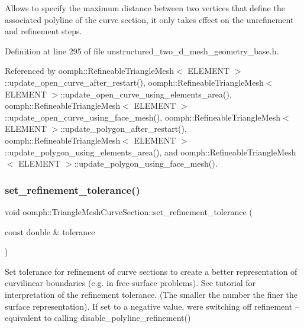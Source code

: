 Allows to specify the maximum distance between two vertices that define the associated polyline of the curve section, it only takes effect on the unrefinement and refinement steps. 



Definition at line 295 of file unstructured\+\_\+two\+\_\+d\+\_\+mesh\+\_\+geometry\+\_\+base.\+h.



Referenced by oomph\+::\+Refineable\+Triangle\+Mesh$<$ E\+L\+E\+M\+E\+N\+T $>$\+::update\+\_\+open\+\_\+curve\+\_\+after\+\_\+restart(), oomph\+::\+Refineable\+Triangle\+Mesh$<$ E\+L\+E\+M\+E\+N\+T $>$\+::update\+\_\+open\+\_\+curve\+\_\+using\+\_\+elements\+\_\+area(), oomph\+::\+Refineable\+Triangle\+Mesh$<$ E\+L\+E\+M\+E\+N\+T $>$\+::update\+\_\+open\+\_\+curve\+\_\+using\+\_\+face\+\_\+mesh(), oomph\+::\+Refineable\+Triangle\+Mesh$<$ E\+L\+E\+M\+E\+N\+T $>$\+::update\+\_\+polygon\+\_\+after\+\_\+restart(), oomph\+::\+Refineable\+Triangle\+Mesh$<$ E\+L\+E\+M\+E\+N\+T $>$\+::update\+\_\+polygon\+\_\+using\+\_\+elements\+\_\+area(), and oomph\+::\+Refineable\+Triangle\+Mesh$<$ E\+L\+E\+M\+E\+N\+T $>$\+::update\+\_\+polygon\+\_\+using\+\_\+face\+\_\+mesh().

\mbox{\label{classoomph_1_1TriangleMeshCurveSection_a3ebe8f25753aefe11af4aa8081644462}} 
\subsubsection{\texorpdfstring{set\+\_\+refinement\+\_\+tolerance()}{set\_refinement\_tolerance()}}
{\footnotesize\ttfamily void oomph\+::\+Triangle\+Mesh\+Curve\+Section\+::set\+\_\+refinement\+\_\+tolerance (\begin{DoxyParamCaption}\item[{const double \&}]{tolerance }\end{DoxyParamCaption})\hspace{0.3cm}{\ttfamily [inline]}}



Set tolerance for refinement of curve sections to create a better representation of curvilinear boundaries (e.\+g. in free-\/surface problems). See tutorial for interpretation of the refinement tolerance. (The smaller the number the finer the surface representation). If set to a negative value, we\textquotesingle{}re switching off refinement -- equivalent to calling disable\+\_\+polyline\+\_\+refinement() 



